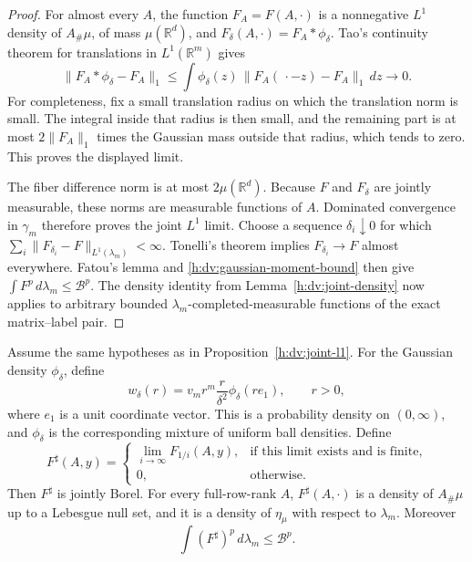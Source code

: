 \begin{proof}
For almost every \(A\), the function \(F_A=F(A,\cdot)\) is a
nonnegative \(L^1\) density of \(A_\#\mu\), of mass
\(\mu(\mathbb R^d)\), and
\(F_\delta(A,\cdot)=F_A*\phi_\delta\).  Tao's continuity theorem for
translations in \(L^1(\mathbb R^m)\)
\cite[Proposition~1.6.13]{TaoMeasure2011} gives
\[
 \|F_A*\phi_\delta-F_A\|_1
 \le\int\phi_\delta(z)\,
          \|F_A(\,\cdot-z)-F_A\|_1\,dz
 \longrightarrow0.
\]
For completeness, fix a small translation radius on which the
translation norm is small.  The integral inside that radius is then
small, and the remaining part is at most
\(2\|F_A\|_1\) times the Gaussian mass outside that radius, which
tends to zero.  This proves the displayed limit.

The fiber difference norm is at most \(2\mu(\mathbb R^d)\).
Because \(F\) and \(F_\delta\) are jointly measurable, these norms
are measurable functions of \(A\).  Dominated convergence in
\(\gamma_m\) therefore proves the joint \(L^1\) limit.  Choose a
sequence \(\delta_i\downarrow0\) for which
\(\sum_i\|F_{\delta_i}-F\|_{L^1(\lambda_m)}<\infty\).
Tonelli's theorem implies \(F_{\delta_i}\to F\) almost everywhere.
Fatou's lemma and \eqref{h:dv:gaussian-moment-bound} then give
\(\int F^p\,d\lambda_m\le\mathcal B^p\).  The density identity from
Lemma~\ref{h:dv:joint-density} now applies to arbitrary bounded
\(\lambda_m\)-completed-measurable functions of the exact
matrix--label pair.
\end{proof}

\begin{proposition}
\label{h:dv:pointwise-density}
Assume the same hypotheses as in Proposition~\ref{h:dv:joint-l1}.
For the Gaussian density \(\phi_\delta\), define
\begin{equation}
 w_\delta(r)
 =v_m r^m\frac{r}{\delta^2}\phi_\delta(r e_1),
 \qquad r>0,
 \label{h:dv:radial-mixture}
\end{equation}
where \(e_1\) is a unit coordinate vector.  This is a probability
density on \((0,\infty)\), and \(\phi_\delta\) is the corresponding
mixture of uniform ball densities.  Define
\begin{equation}
 F^\sharp(A,y)=
 \begin{cases}
  \displaystyle\lim_{i\to\infty}F_{1/i}(A,y),
       &\text{if this limit exists and is finite},\\
  0,   &\text{otherwise}.
 \end{cases}
 \label{h:dv:pointwise-version}
\end{equation}
Then \(F^\sharp\) is jointly Borel.  For every full-row-rank \(A\),
\(F^\sharp(A,\cdot)\) is a density of \(A_\#\mu\) up to a Lebesgue
null set, and it is a density of \(\eta_\mu\) with respect to
\(\lambda_m\).  Moreover
\begin{equation}
 \int(F^\sharp)^p\,d\lambda_m\le\mathcal B^p.
 \label{h:dv:pointwise-moment}
\end{equation}
\end{proposition}


